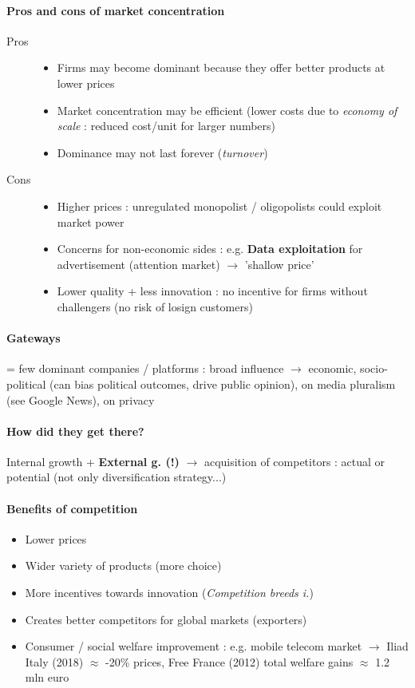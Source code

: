 \documentclass[10pt]{article}
\begin{document}
\paragraph{Pros and cons of market concentration}
\begin{description}
\item[Pros] \begin{itemize}
    \item  Firms may become dominant because they offer better
products at lower prices
\item Market concentration may be efficient (lower costs due to \textit{economy of scale} : reduced cost/unit for larger numbers)
\item Dominance may not last forever (\textit{turnover})
\end{itemize}
\item[Cons]
\begin{itemize}
    \item Higher prices : unregulated monopolist / oligopolists could exploit market power
    \item Concerns for non-economic sides : e.g. \textbf{Data exploitation} for advertisement (attention market) $\rightarrow$ 'shallow price'
    \item Lower quality + less innovation : no incentive for firms without challengers (no risk of losign customers)
\end{itemize}
\end{description}

\paragraph{Gateways} = few dominant companies / platforms : broad influence $\rightarrow$ economic, socio-political (can bias political outcomes, drive public opinion), on media pluralism (see Google News), on privacy
\paragraph{How did they get there?} Internal growth + \textbf{External g. (!)} $\rightarrow$ acquisition of competitors : actual or potential (not only diversification strategy...)

\paragraph{Benefits of competition}
\begin{itemize}
    \item Lower prices
    \item Wider variety of products (more choice)
    \item More incentives towards innovation (\textit{Competition breeds i.})
    \item Creates better competitors for global markets (exporters)
    \item Consumer / social welfare improvement : e.g. mobile telecom market $\rightarrow$ Iliad Italy (2018) $\approx$ -20\% prices, Free France (2012) total welfare gains $\approx$ 1.2 mln euro
\end{itemize}
\end{document}
